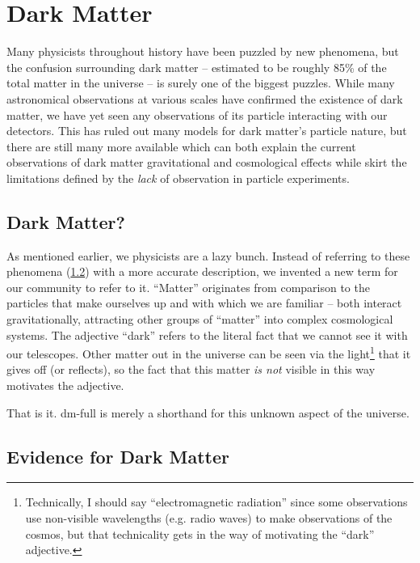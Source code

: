\chapter{Dark Matter}
\label{chapter:dm}

Many physicists throughout history have been puzzled by new phenomena, but the confusion
surrounding dark matter -- estimated to be roughly 85\% of the total matter in the universe -- is
surely one of the biggest puzzles. While many astronomical observations at various scales have
confirmed the existence of dark matter, we have yet seen any observations of its particle
interacting with our detectors. This has ruled out many models for dark matter's particle nature,
but there are still many more available which can both explain the current observations of dark
matter gravitational and cosmological effects while skirt the limitations defined by the
\emph{lack} of observation in particle experiments.

\section{Dark Matter?}
As mentioned earlier, we physicists are a lazy bunch. Instead of referring to these phenomena
(\cref{sec:dm:evidence}) with a more accurate description, we invented a new term for our community
to refer to it. ``Matter'' originates from comparison to the particles that make ourselves up and
with which we are familiar -- both interact gravitationally, attracting other groups of ``matter''
into complex cosmological systems. The adjective ``dark'' refers to the literal fact that we cannot
see it with our telescopes. Other matter out in the universe can be seen via the light\footnote{
  Technically, I should say ``electromagnetic radiation'' since some observations use non-visible
  wavelengths (e.g. radio waves) to make observations of the cosmos, but that technicality gets in
  the way of motivating the ``dark'' adjective. } that it gives off (or reflects), so the fact that
this matter \emph{is not} visible in this way motivates the adjective.

That is it. \gls{dm-full} is merely a shorthand for this unknown aspect of the universe.

\section{Evidence for Dark Matter}
\label{sec:dm:evidence}

